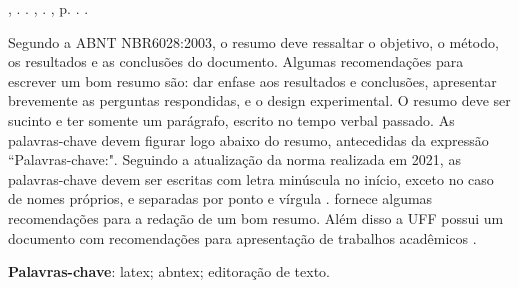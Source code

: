 \setlength{\absparsep}{18pt} %
\begin{resumo}
    \fonteResumo

\begin{flushleft}
\MakeUppercase{\imprimirSobrenome}, \imprimirPrimeirosNomes. \textbf{\imprimirtitulo}. \imprimirtipotrabalho, \imprimirinstituicao. \imprimirlocal,  p. \pageref{LastPage}. \imprimirAnoDeDefesa.
\end{flushleft}

Segundo a ABNT NBR6028:2003, o resumo deve ressaltar o objetivo, o método, os resultados e as conclusões do documento. Algumas recomendações para escrever um bom resumo são: dar enfase aos resultados e conclusões, apresentar brevemente as perguntas respondidas, e o design experimental. O resumo deve ser sucinto e ter somente um parágrafo, escrito no tempo verbal passado. As palavras-chave devem figurar logo abaixo do resumo, antecedidas da expressão ``Palavras-chave:". Seguindo a atualização da norma realizada em 2021, as palavras-chave devem ser escritas com letra minúscula no início, exceto no caso de nomes próprios, e separadas por ponto e vírgula \cite{palavraschave}.  fornece algumas recomendações para a redação de um bom resumo. Além disso a UFF possui um documento com recomendações para apresentação de trabalhos acadêmicos \cite{Abreu2012}.

    \textbf{Palavras-chave}: latex; abntex; editoração de texto.
\end{resumo}
